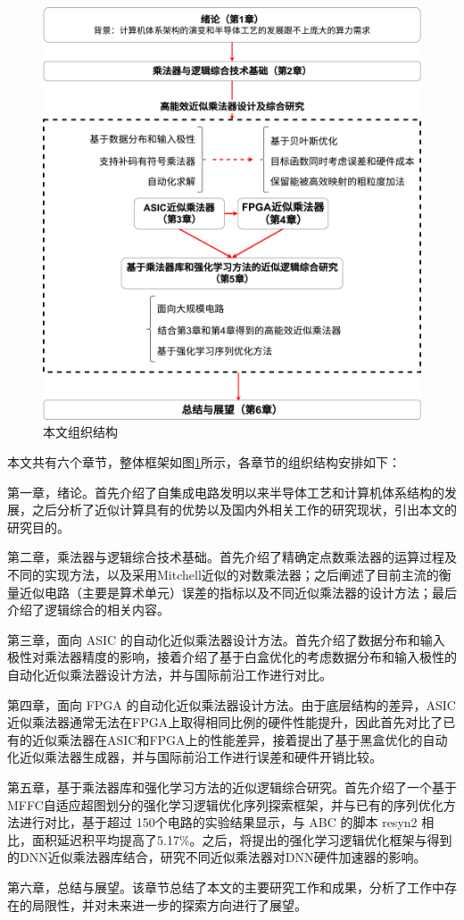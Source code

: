 \begin{figure}[!htb]
    \centering
    \includegraphics[width=\textwidth]{figs/论文结构.pdf}
    \caption{本文组织结构}
    \label{本文组织结构}
\end{figure}

本文共有六个章节，整体框架如图\ref{本文组织结构}所示，各章节的组织结构安排如下：

第一章，绪论。首先介绍了自集成电路发明以来半导体工艺和计算机体系结构的发展，之后分析了近似计算具有的优势以及国内外相关工作的研究现状，引出本文的研究目的。

第二章，乘法器与逻辑综合技术基础。首先介绍了精确定点数乘法器的运算过程及不同的实现方法，以及采用Mitchell近似的对数乘法器\cite{EM:mitchell}；之后阐述了目前主流的衡量近似电路（主要是算术单元）误差的指标以及不同近似乘法器的设计方法；最后介绍了逻辑综合的相关内容。

第三章，面向 ASIC 的自动化近似乘法器设计方法。首先介绍了数据分布和输入极性对乘法器精度的影响，接着介绍了基于白盒优化的考虑数据分布和输入极性的自动化近似乘法器设计方法，并与国际前沿工作进行对比。

第四章，面向 FPGA 的自动化近似乘法器设计方法。由于底层结构的差异，ASIC近似乘法器通常无法在FPGA上取得相同比例的硬件性能提升，因此首先对比了已有的近似乘法器在ASIC和FPGA上的性能差异，接着提出了基于黑盒优化的自动化近似乘法器生成器，并与国际前沿工作进行误差和硬件开销比较。

第五章，基于乘法器库和强化学习方法的近似逻辑综合研究。首先介绍了一个基于MFFC自适应超图划分的强化学习逻辑优化序列探索框架，并与已有的序列优化方法进行对比，基于超过 150个电路的实验结果显示，与 ABC 的脚本 resyn2 相比，面积延迟积平均提高了5.17\%。之后，将提出的强化学习逻辑优化框架与得到的DNN近似乘法器库结合，研究不同近似乘法器对DNN硬件加速器的影响。

第六章，总结与展望。该章节总结了本文的主要研究工作和成果，分析了工作中存在的局限性，并对未来进一步的探索方向进行了展望。

